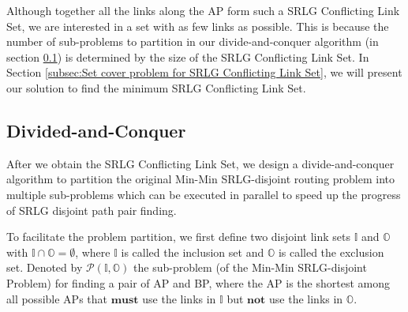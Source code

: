 Although together all the links along the AP form such a SRLG Conflicting Link Set, we are interested in a set with as few links as possible. This is because the number of sub-problems to partition in our divide-and-conquer algorithm (in section \ref{subsec:dividedconquer}) is determined by  the size of the SRLG Conflicting Link Set. In Section \ref{subsec:Set cover problem for SRLG Conflicting Link Set}, we will present our solution to find the minimum SRLG Conflicting Link Set.


%



\subsection{Divided-and-Conquer}
\label{subsec:dividedconquer}
After we obtain the SRLG Conflicting Link Set, we design a divide-and-conquer algorithm to partition the original Min-Min SRLG-disjoint routing problem into multiple sub-problems which can be executed in parallel to speed up the progress of SRLG disjoint path pair finding.

To facilitate the problem partition, we first define two disjoint link sets $\mathbb{I}$ and ${\mathbb{O}}$ with $\mathbb{I}\cap {\mathbb{O}}= \emptyset$,  where $\mathbb{I}$ is called the  inclusion set and ${\mathbb{O}}$ is called the exclusion set. Denoted by $\mathcal{P}({\mathbb{I},\mathbb{O}})$ the sub-problem (of the Min-Min SRLG-disjoint Problem) for finding a pair of AP and BP, where the AP is the shortest among all possible APs that $\textbf{must}$ use the links in $\mathbb{I}$ but $\textbf{not}$ use the links in ${\mathbb{O}}$.

